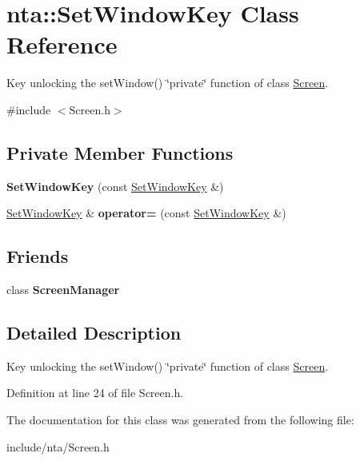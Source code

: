 \hypertarget{classnta_1_1SetWindowKey}{}\section{nta\+:\+:Set\+Window\+Key Class Reference}
\label{classnta_1_1SetWindowKey}


Key unlocking the set\+Window() \char`\"{}private\char`\"{} function of class \hyperlink{classnta_1_1Screen}{Screen}.  




{\ttfamily \#include $<$Screen.\+h$>$}

\subsection*{Private Member Functions}
\begin{DoxyCompactItemize}
\item 
\mbox{\label{classnta_1_1SetWindowKey_a0f684f229f8eab0cb2344656dfb11a4f}} 
{\bfseries Set\+Window\+Key} (const \hyperlink{classnta_1_1SetWindowKey}{Set\+Window\+Key} \&)
\item 
\mbox{\label{classnta_1_1SetWindowKey_abb91da101149ee2639f043b51ebf9def}} 
\hyperlink{classnta_1_1SetWindowKey}{Set\+Window\+Key} \& {\bfseries operator=} (const \hyperlink{classnta_1_1SetWindowKey}{Set\+Window\+Key} \&)
\end{DoxyCompactItemize}
\subsection*{Friends}
\begin{DoxyCompactItemize}
\item 
\mbox{\label{classnta_1_1SetWindowKey_a888edc649fed896d28811ec69f3f2066}} 
class {\bfseries Screen\+Manager}
\end{DoxyCompactItemize}


\subsection{Detailed Description}
Key unlocking the set\+Window() \char`\"{}private\char`\"{} function of class \hyperlink{classnta_1_1Screen}{Screen}. 

Definition at line 24 of file Screen.\+h.



The documentation for this class was generated from the following file\+:\begin{DoxyCompactItemize}
\item 
include/nta/Screen.\+h\end{DoxyCompactItemize}
